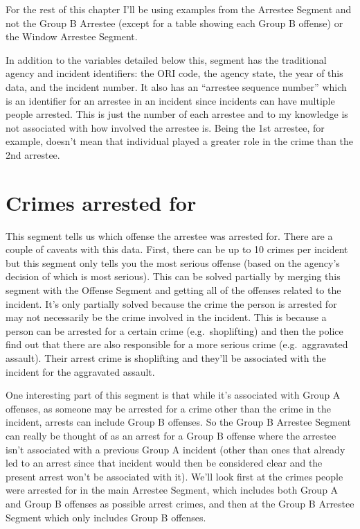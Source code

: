 \documentclass[
  12pt,
  openany]{book}
\begin{document}
For the rest of this chapter I'll be using examples from the Arrestee Segment and not the Group B Arrestee (except for a table showing each Group B offense) or the Window Arrestee Segment.

In addition to the variables detailed below this, segment has the traditional agency and incident identifiers: the ORI code, the agency state, the year of this data, and the incident number. It also has an ``arrestee sequence number'' which is an identifier for an arrestee in an incident since incidents can have multiple people arrested. This is just the number of each arrestee and to my knowledge is not associated with how involved the arrestee is. Being the 1st arrestee, for example, doesn't mean that individual played a greater role in the crime than the 2nd arrestee.

\section{Crimes arrested for}\label{crimes-arrested-for}

This segment tells us which offense the arrestee was arrested for. There are a couple of caveats with this data. First, there can be up to 10 crimes per incident but this segment only tells you the most serious offense (based on the agency's decision of which is most serious). This can be solved partially by merging this segment with the Offense Segment and getting all of the offenses related to the incident. It's only partially solved because the crime the person is arrested for may not necessarily be the crime involved in the incident. This is because a person can be arrested for a certain crime (e.g.~shoplifting) and then the police find out that there are also responsible for a more serious crime (e.g.~aggravated assault). Their arrest crime is shoplifting and they'll be associated with the incident for the aggravated assault.

One interesting part of this segment is that while it's associated with Group A offenses, as someone may be arrested for a crime other than the crime in the incident, arrests can include Group B offenses. So the Group B Arrestee Segment can really be thought of as an arrest for a Group B offense where the arrestee isn't associated with a previous Group A incident (other than ones that already led to an arrest since that incident would then be considered clear and the present arrest won't be associated with it). We'll look first at the crimes people were arrested for in the main Arrestee Segment, which includes both Group A and Group B offenses as possible arrest crimes, and then at the Group B Arrestee Segment which only includes Group B offenses.
\end{document}
